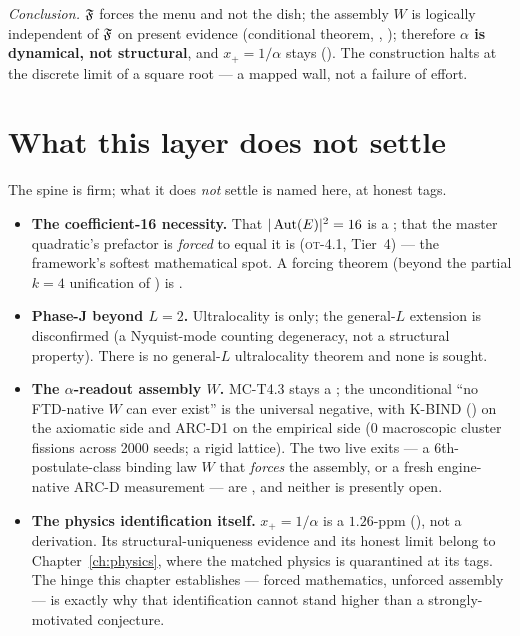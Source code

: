 \emph{Conclusion.} $\mathfrak{F}$ forces the menu and not the dish; the assembly
$W$ is logically independent of $\mathfrak{F}$ on present evidence (conditional
theorem, , ); therefore \textbf{$\alpha$ is dynamical, not
structural}, and $x_+=1/\alpha$ stays  (). The
construction halts at the discrete limit of a square root --- a mapped wall,
not a failure of effort.

\section{What this layer does not settle}
\label{sec:math-open}

The spine is firm; what it does \emph{not} settle is named here, at honest tags.

\begin{itemize}[leftmargin=1.4em, itemsep=3pt]
  \item \textbf{The coefficient-16 necessity.} That $|\operatorname{Aut}(E)|^{2}=16$ is a
    ; that the master quadratic's prefactor is \emph{forced} to equal
    it is  (\textsc{ot}-4.1, Tier~4) --- the framework's softest
    mathematical spot. A forcing theorem (beyond the partial $k=4$ unification
    of ) is .

  \item \textbf{Phase-J beyond $L=2$.} Ultralocality is 
    only; the general-$L$ extension is disconfirmed (a Nyquist-mode counting
    degeneracy, not a structural property). There is no general-$L$
    ultralocality theorem and none is sought.

  \item \textbf{The $\alpha$-readout assembly $W$.} MC-T4.3 stays a
    ; the unconditional ``no FTD-native $W$ can ever exist'' is
    the universal negative, with K-BIND  () on the
    axiomatic side and ARC-D1  on the empirical side (0 macroscopic
    cluster fissions across 2000 seeds; a rigid lattice). The two live exits ---
    a 6th-postulate-class binding law $W$ that \emph{forces} the assembly, or a
    fresh engine-native ARC-D measurement --- are , and neither is
    presently open.

  \item \textbf{The physics identification itself.} $x_+=1/\alpha$ is a
    $1.26$-ppm  (), not a derivation. Its
    structural-uniqueness evidence and its honest limit belong to
    Chapter~\ref{ch:physics}, where the matched physics is quarantined at its
    tags. The hinge this chapter establishes --- forced mathematics, unforced
    assembly --- is exactly why that identification cannot stand higher than a
    strongly-motivated conjecture.
\end{itemize}
